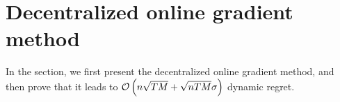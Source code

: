 \documentclass{article}
\begin{document}
%
%
%
%




\section{Decentralized online gradient method} \label{sec:algorithm}
In the section, we first present the decentralized online gradient method, and then prove that it leads to ${\mathcal{O}\left( n\sqrt{TM} + \sqrt{nTM}\sigma \right)}$ dynamic regret. 
\end{document}
